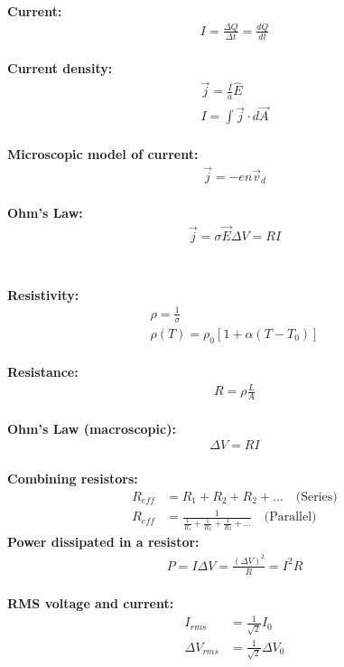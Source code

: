 \newpage
\begin{importantEquations}
\begin{multicols}{2}
\textbf{Current:}
\begin{align*}
I = \frac{\Delta Q}{\Delta t}=\frac{dQ}{dt} 
\end{align*}
\\
\textbf{Current density:}
\begin{align*}
\vec j = \frac{I}{a}\hat E \\
I = \int \vec j \cdot d \vec A
\end{align*}
\\
\textbf{Microscopic model of current:}
\begin{align*}
\vec j = -en \vec v_d
\end{align*}
\\
\textbf{Ohm's Law:}
\begin{align*}
\vec j = \sigma \vec E
\Delta V = R I\\
\end{align*}
\\
\columnbreak
\\
\textbf{Resistivity:}
\begin{align*}
\rho = \frac{1}{\sigma}\\
\rho(T)=\rho_0[1+\alpha(T-T_0)]
\end{align*}
\\
\textbf{Resistance:}
\begin{align*}
R = \rho \frac{L}{A}
\end{align*}
\\
\textbf{Ohm's Law (macroscopic):}
\begin{align*}
\Delta V = R I
\end{align*}
\\
\textbf{Combining resistors:}
\begin{align*}
R_{eff}&=R_1+R_2+R_2+\dots\quad\text{(Series)}\\
R_{eff}&=\frac{1}{\frac{1}{R_1}+\frac{1}{R_2}+\frac{1}{R_3}+\dots}\quad\text{(Parallel)}
\end{align*}
\textbf{Power dissipated in a resistor:}
\begin{align*}
P=I \Delta V=\frac{(\Delta V)^2}{R}=I^2R
\end{align*}
\\
\textbf{RMS voltage and current:}
\begin{align*}
I_{rms}&=\frac{1}{\sqrt 2}I_0\\
\Delta V_{rms}&=\frac{1}{\sqrt 2}\Delta V_0
\end{align*}
\\
\end{multicols}
\end{importantEquations}
